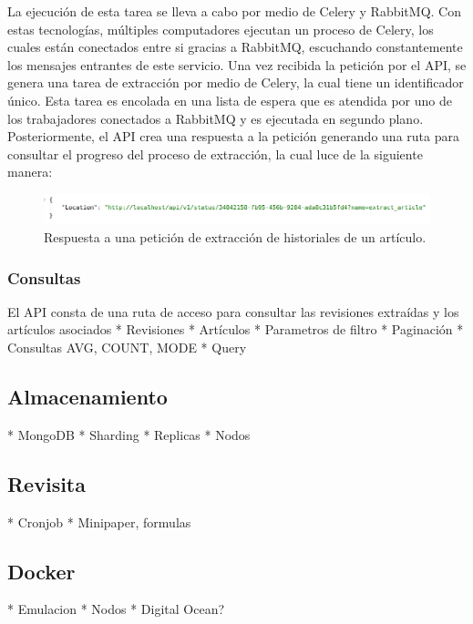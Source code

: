 La ejecución de esta tarea se lleva a cabo por medio de Celery y RabbitMQ.
Con estas tecnologías, múltiples computadores ejecutan un proceso de Celery, los
cuales están conectados entre si gracias a RabbitMQ, escuchando constantemente los mensajes entrantes de este servicio.
Una vez recibida la petición por el API, se genera una tarea de extracción por medio de Celery, la cual tiene un identificador único. Esta tarea es encolada en una lista de
espera que es atendida por uno de los trabajadores conectados a RabbitMQ y es ejecutada en segundo plano.
Posteriormente, el API crea una respuesta a la petición generando una ruta para consultar el progreso
del proceso de extracción, la cual luce de la siguiente manera:

\begin{figure}[H]
	\centering
		\includegraphics[width=1\textwidth]{figures/extract_response}
	\caption{Respuesta a una petición de extracción de historiales de un artículo.}
	\label{fig:extract_response}
\end{figure}

\subsubsection{Consultas}

El API consta de una ruta de acceso para consultar las revisiones extraídas y
los artículos asociados
* Revisiones
* Artículos
* Parametros de filtro
* Paginación
* Consultas AVG, COUNT, MODE
* Query

\subsection{Almacenamiento}

* MongoDB
* Sharding
* Replicas
* Nodos

\subsection{Revisita}

* Cronjob
* Minipaper, formulas

\subsection{Docker}

* Emulacion
* Nodos
* Digital Ocean?
